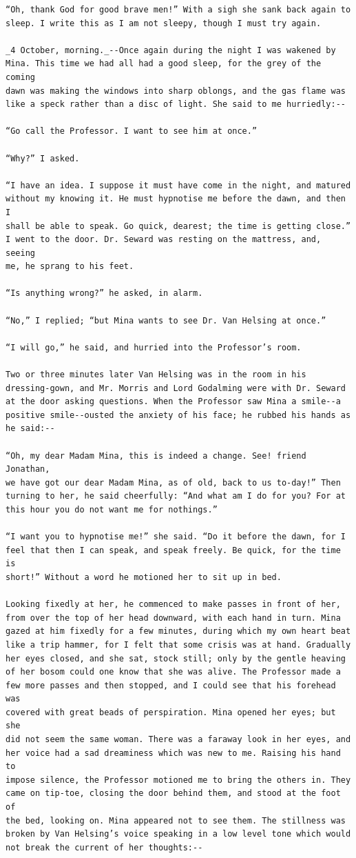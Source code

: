 \documentclass{article}
\begin{document}
\begin{verbatim}
“Oh, thank God for good brave men!” With a sigh she sank back again to
sleep. I write this as I am not sleepy, though I must try again.

_4 October, morning._--Once again during the night I was wakened by
Mina. This time we had all had a good sleep, for the grey of the coming
dawn was making the windows into sharp oblongs, and the gas flame was
like a speck rather than a disc of light. She said to me hurriedly:--

“Go call the Professor. I want to see him at once.”

“Why?” I asked.

“I have an idea. I suppose it must have come in the night, and matured
without my knowing it. He must hypnotise me before the dawn, and then I
shall be able to speak. Go quick, dearest; the time is getting close.”
I went to the door. Dr. Seward was resting on the mattress, and, seeing
me, he sprang to his feet.

“Is anything wrong?” he asked, in alarm.

“No,” I replied; “but Mina wants to see Dr. Van Helsing at once.”

“I will go,” he said, and hurried into the Professor’s room.

Two or three minutes later Van Helsing was in the room in his
dressing-gown, and Mr. Morris and Lord Godalming were with Dr. Seward
at the door asking questions. When the Professor saw Mina a smile--a
positive smile--ousted the anxiety of his face; he rubbed his hands as
he said:--

“Oh, my dear Madam Mina, this is indeed a change. See! friend Jonathan,
we have got our dear Madam Mina, as of old, back to us to-day!” Then
turning to her, he said cheerfully: “And what am I do for you? For at
this hour you do not want me for nothings.”

“I want you to hypnotise me!” she said. “Do it before the dawn, for I
feel that then I can speak, and speak freely. Be quick, for the time is
short!” Without a word he motioned her to sit up in bed.

Looking fixedly at her, he commenced to make passes in front of her,
from over the top of her head downward, with each hand in turn. Mina
gazed at him fixedly for a few minutes, during which my own heart beat
like a trip hammer, for I felt that some crisis was at hand. Gradually
her eyes closed, and she sat, stock still; only by the gentle heaving
of her bosom could one know that she was alive. The Professor made a
few more passes and then stopped, and I could see that his forehead was
covered with great beads of perspiration. Mina opened her eyes; but she
did not seem the same woman. There was a faraway look in her eyes, and
her voice had a sad dreaminess which was new to me. Raising his hand to
impose silence, the Professor motioned me to bring the others in. They
came on tip-toe, closing the door behind them, and stood at the foot of
the bed, looking on. Mina appeared not to see them. The stillness was
broken by Van Helsing’s voice speaking in a low level tone which would
not break the current of her thoughts:--


\end{verbatim}
\end{document}
